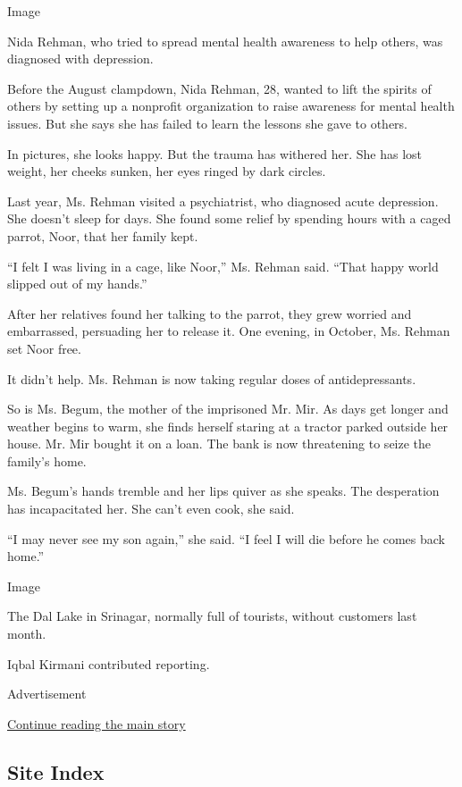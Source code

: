 Image

Nida Rehman, who tried to spread mental health awareness to help others,
was diagnosed with depression.

Before the August clampdown, Nida Rehman, 28, wanted to lift the spirits
of others by setting up a nonprofit organization to raise awareness for
mental health issues. But she says she has failed to learn the lessons
she gave to others.

In pictures, she looks happy. But the trauma has withered her. She has
lost weight, her cheeks sunken, her eyes ringed by dark circles.

Last year, Ms. Rehman visited a psychiatrist, who diagnosed acute
depression. She doesn't sleep for days. She found some relief by
spending hours with a caged parrot, Noor, that her family kept.

``I felt I was living in a cage, like Noor,'' Ms. Rehman said. ``That
happy world slipped out of my hands.''

After her relatives found her talking to the parrot, they grew worried
and embarrassed, persuading her to release it. One evening, in October,
Ms. Rehman set Noor free.

It didn't help. Ms. Rehman is now taking regular doses of
antidepressants.

So is Ms. Begum, the mother of the imprisoned Mr. Mir. As days get
longer and weather begins to warm, she finds herself staring at a
tractor parked outside her house. Mr. Mir bought it on a loan. The bank
is now threatening to seize the family's home.

Ms. Begum's hands tremble and her lips quiver as she speaks. The
desperation has incapacitated her. She can't even cook, she said.

``I may never see my son again,'' she said. ``I feel I will die before
he comes back home.''

Image

The Dal Lake in Srinagar, normally full of tourists, without customers
last month.

Iqbal Kirmani contributed reporting.

Advertisement

\protect\hyperlink{after-bottom}{Continue reading the main story}

\hypertarget{site-index}{%
\subsection{Site Index}\label{site-index}}

